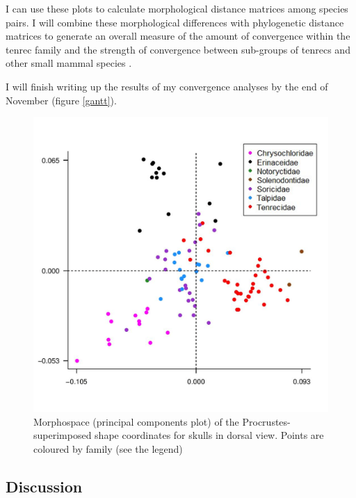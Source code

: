 \documentclass[12pt,a4paper]{article}
\begin{document}
	I can use these plots to calculate morphological distance matrices among species pairs. I will combine these morphological differences with phylogenetic distance matrices to generate an overall measure of the amount of convergence within the tenrec family \citep{Stayton2008} and the strength of convergence between sub-groups of tenrecs and other small mammal species \citep{Arbuckle2014}.

	I will finish writing up the results of my convergence analyses by the end of November (figure \ref{gantt}).

	

  \begin{figure}[!htb]
	\centering
	\includegraphics[width=\textwidth, height=\textheight, keepaspectratio=true]{skdors_allfam_PCA_legend.png}
		\caption{Morphospace (principal components plot) of the 		Procrustes-superimposed shape coordinates for skulls in dorsal view. Points are coloured by family (see the legend)}
	\label{fig:skdors_pca}
  \end{figure}

	

\subsection{Discussion}
\end{document}
